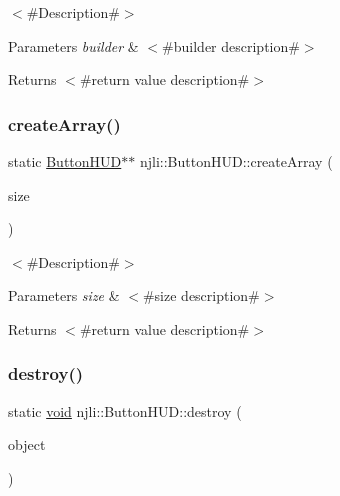 $<$\#\+Description\#$>$


\begin{DoxyParams}{Parameters}
{\em builder} & $<$\#builder description\#$>$\\
\hline
\end{DoxyParams}
\begin{DoxyReturn}{Returns}
$<$\#return value description\#$>$ 
\end{DoxyReturn}
\mbox{\label{classnjli_1_1_button_h_u_d_aa1d06fd625897be831ed75aacb99631f}} 
\subsubsection{\texorpdfstring{create\+Array()}{createArray()}}
{\footnotesize\ttfamily static \mbox{\hyperlink{classnjli_1_1_button_h_u_d}{Button\+H\+UD}}$\ast$$\ast$ njli\+::\+Button\+H\+U\+D\+::create\+Array (\begin{DoxyParamCaption}\item[{const \mbox{\hyperlink{_util_8h_a10e94b422ef0c20dcdec20d31a1f5049}{u32}}}]{size }\end{DoxyParamCaption})\hspace{0.3cm}{\ttfamily [static]}}

$<$\#\+Description\#$>$


\begin{DoxyParams}{Parameters}
{\em size} & $<$\#size description\#$>$\\
\hline
\end{DoxyParams}
\begin{DoxyReturn}{Returns}
$<$\#return value description\#$>$ 
\end{DoxyReturn}
\mbox{\label{classnjli_1_1_button_h_u_d_a92a3967c328fb717935fb4667544e1c4}} 
\subsubsection{\texorpdfstring{destroy()}{destroy()}}
{\footnotesize\ttfamily static \mbox{\hyperlink{_thread_8h_af1e856da2e658414cb2456cb6f7ebc66}{void}} njli\+::\+Button\+H\+U\+D\+::destroy (\begin{DoxyParamCaption}\item[{\mbox{\hyperlink{classnjli_1_1_button_h_u_d}{Button\+H\+UD}} $\ast$}]{object }\end{DoxyParamCaption})\hspace{0.3cm}{\ttfamily [static]}}

